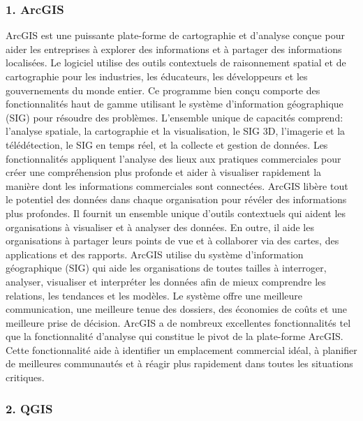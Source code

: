 \documentclass[french, a4paper, 12pt]{report}
\begin{document}
\subsubsection{1. ArcGIS}
ArcGIS est une puissante plate-forme de cartographie et d'analyse conçue pour aider les entreprises à explorer des informations et à partager des informations localisées. Le logiciel utilise des outils contextuels de raisonnement spatial et de cartographie pour les industries, les éducateurs, les développeurs et les gouvernements du monde entier.
Ce programme bien conçu comporte des fonctionnalités haut de gamme utilisant le système d’information géographique (SIG) pour résoudre des problèmes. L'ensemble unique de capacités comprend: l’analyse spatiale, la cartographie et la visualisation, le SIG 3D, l’imagerie et la télédétection, le SIG en temps réel, et la collecte et gestion de données. Les fonctionnalités appliquent l'analyse des lieux aux pratiques commerciales pour créer une compréhension plus profonde et aider à visualiser rapidement la manière dont les informations commerciales sont connectées. ArcGIS libère tout le potentiel des données dans chaque organisation pour révéler des informations plus profondes. Il fournit un ensemble unique d'outils contextuels qui aident les organisations à visualiser et à analyser des données. En outre, il aide les organisations à partager leurs points de vue et à collaborer via des cartes, des applications et des rapports.
ArcGIS utilise du système d’information géographique (SIG) qui aide les organisations de toutes tailles à interroger, analyser, visualiser et interpréter les données afin de mieux comprendre les relations, les tendances et les modèles. Le système offre une meilleure communication, une meilleure tenue des dossiers, des économies de coûts et une meilleure prise de décision.
ArcGIS a de nombreux excellentes fonctionnalités tel que la fonctionnalité d'analyse qui constitue le pivot de la plate-forme ArcGIS. Cette fonctionnalité aide à identifier un emplacement commercial idéal, à planifier de meilleures communautés et à réagir plus rapidement dans toutes les situations critiques.

\subsubsection{2. QGIS}
\end{document}
